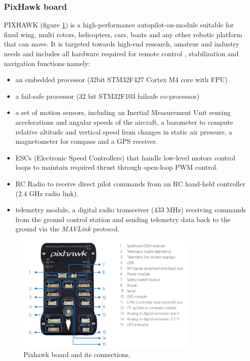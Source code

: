 \subsubsection{PixHawk board}
\label{sec:pixboard}
PIXHAWK (figure \ref{figure:pixhawk}) is a high-performance autopilot-on-module suitable for fixed wing, multi rotors, helicopters, cars, boats and any other robotic platform that can move. It is targeted towards high-end research, amateur and industry needs and includes all hardware required for remote control \cite{PiXH}, stabilization and navigation functions namely:

\begin{itemize}
\item an embedded processor (32bit STM32F427 Cortex M4 core with FPU)
\item a fail-safe processor (32 bit STM32F103 failsafe co-processor)
\item a set of motion sensors, including an Inertial Measurement Unit sensing accelerations and angular speeds of the aircraft, a barometer to compute relative altitude and vertical speed from changes in static air pressure, a magnetometer for compass and a GPS receiver.

\item ESCs (Electronic Speed Controllers) that handle low-level motors control loops to maintain required thrust through open-loop PWM control.

\item RC Radio to receive direct pilot commands from an RC hand-held controller (2.4 GHz radio link).
\item telemetry module, a digital radio transceiver (433 MHz) receiving commands from the ground control station and sending telemetry data back to the ground via the \textit{MAVLink} protocol.
\end{itemize}

\begin{figure}[h]
 \centering
 \includegraphics[width=0.8\textwidth]{pixhawk.PNG}
 \caption[Pixhawk board]{Pixhawk board and its connections.}
 \label{figure:pixhawk}
\end{figure}


